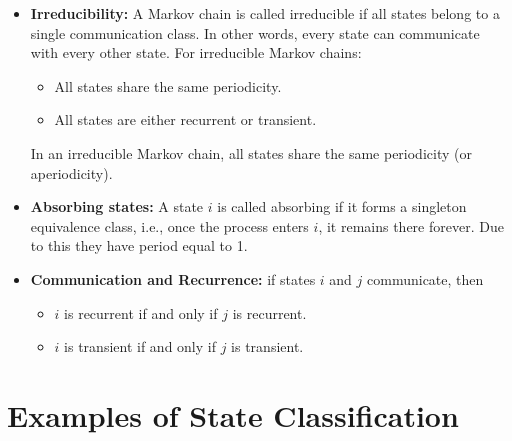 \begin{itemize}
    \item \textbf{Irreducibility:} A Markov chain is called irreducible if all states belong to a single communication class. In other words, every state can communicate with every other state. For irreducible Markov chains:
        \begin{itemize}
            \item All states share the same periodicity.
            \item All states are either recurrent or transient.
        \end{itemize}
    In an irreducible Markov chain, all states share the same periodicity (or aperiodicity).
                
    \item \textbf{Absorbing states:} A state \( i \) is called absorbing if it forms a singleton equivalence class, i.e., once the process enters \( i \), it remains there forever. Due to this they have period equal to 1. 

    \item \textbf{Communication and Recurrence:} if states \( i \) and \( j \) communicate, then
        \begin{itemize}
            \item \( i \) is recurrent if and only if \( j \) is recurrent.
            \item \( i \) is transient if and only if \( j \) is transient.
        \end{itemize}
    
\end{itemize}




\section{Examples of State Classification}
